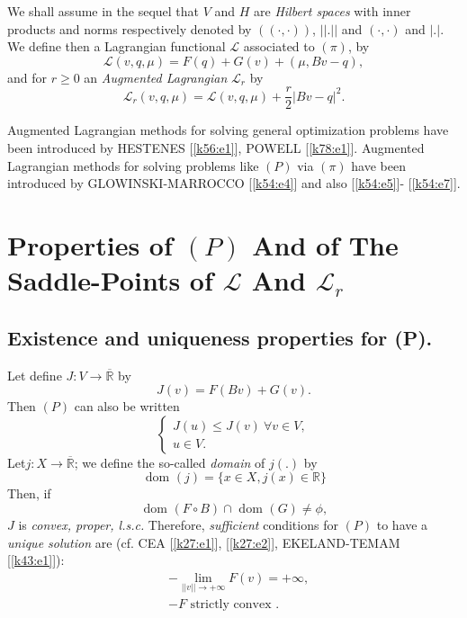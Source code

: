 \noindent
We shall assume in the sequel that $V$ and $H$ are \textit{Hilbert
  spaces} with inner products and norms respectively denoted by
$((\cdot,\cdot))$, $|| . ||$ and $(\cdot,\cdot)$ and $|.|$. We define then a
Lagrangian functional $\mathscr{L}$ associated to $(\pi)$, by  
\begin{equation}
\mathscr{L} (v, q, \mu) = F (q) + G (v) + (\mu, Bv-q), \tag{1.3}\label{c5:eq1.3}
\end{equation}
and for $r \geq 0$ an \textit{Augmented Lagrangian} $\mathscr{L}_r$ by 
\begin{equation}
\mathscr{L}_r (v, q, \mu) = \mathscr{L} (v, q, \mu) + \frac{r}{2} |Bv- q|^2.\tag{1.4}\label{c5:eq1.4}
\end{equation}

\begin{remark}\label{c5:rem1.1}%
Augmented Lagrangian methods for solving general optimization problems
have been introduced by HESTENES [\ref{k56:e1}], POWELL
[\ref{k78:e1}]. Augmented Lagrangian 
methods for solving problems like $(P)$ via $(\pi)$ have been
introduced by GLOWINSKI-MARROCCO [\ref{k54:e4}] and also
[\ref{k54:e5}]- [\ref{k54:e7}]. 
\end{remark}

\section[Properties of $(P)$ And of The Saddle-Points...]{Properties
  of $(P)$ And of The Saddle-Points of $\mathscr{L}$ And
  $\mathscr{L}_r$}\label{c5:s2}%

\subsection{Existence and uniqueness properties for 
(P).}\label{c5:ss2.1}%

Let define $J : V \to \overline{\mathbb{R}}$ by 
$$
J (v) = F (Bv) + G (v).
$$
Then $(P)$ can also be written 
\begin{equation}
\begin{cases}
J(u) \leq J (v) ~ \forall v \in V,\\
u \in V. \tag{2.1}\label{c5:eq2.1}
\end{cases}
\end{equation}
Let\pageoriginale  $j : X \to \overline{\mathbb{R}}$; we define the so-called \textit{domain} of $j(.)$ by 
$$
\text{ dom }(j) = \{x \in X, j(x) \in \mathbb{R}\}
$$
Then, if 
\begin{equation}
\text{ dom } (F \circ B) \cap \text{ dom } (G) \neq \phi, \tag{2.2}\label{c5:eq2.2}
\end{equation}
$J$ is \textit{convex, proper, l.s.c.} Therefore, \textit{sufficient}
conditions for $(P)$ to have a \textit{unique solution} are (cf. CEA
[\ref{k27:e1}], [\ref{k27:e2}], EKELAND-TEMAM [\ref{k43:e1}]): 
\begin{align*}
& - \lim\limits_{|| v || \to + \infty} F (v) = + \infty,\\
& - F \text{ strictly convex }.
\end{align*}

